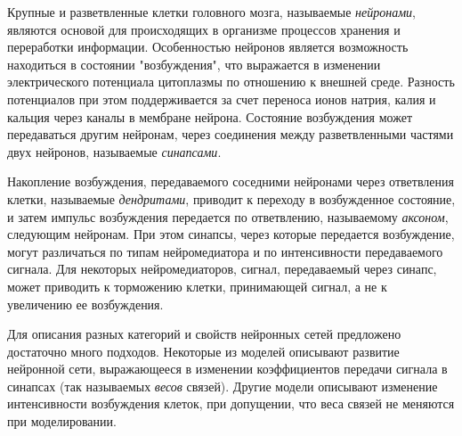 Крупные и разветвленные клетки головного мозга, называемые \textit{нейронами}, являются основой для происходящих в организме  процессов хранения и переработки информации. Особенностью нейронов является возможность находиться в состоянии "возбуждения", что выражается в изменении электрического потенциала цитоплазмы по отношению к внешней среде. Разность потенциалов при этом  поддерживается за счет переноса ионов натрия, калия и кальция через каналы в мембране нейрона. Состояние возбуждения может передаваться другим нейронам, через соединения между разветвленными частями двух нейронов, называемые \textit{синапсами}.

Накопление возбуждения, передаваемого соседними нейронами через ответвления клетки, называемые \textit{дендритами}, приводит к переходу в возбужденное состояние, и затем импульс возбуждения передается по ответвлению, называемому \textit{аксоном}, следующим нейронам. При этом синапсы, через которые передается возбуждение, могут различаться по типам нейромедиатора и по интенсивности передаваемого сигнала. Для некоторых нейромедиаторов, сигнал, передаваемый через синапс, может приводить к торможению клетки, принимающей сигнал, а не к увеличению ее возбуждения.

Для описания разных категорий и свойств нейронных сетей предложено достаточно много подходов. Некоторые из моделей описывают развитие нейронной сети, выражающееся в изменении коэффициентов передачи сигнала в синапсах (так называемых \textit{весов} связей). Другие модели описывают изменение интенсивности возбуждения клеток, при допущении, что веса связей не меняются при моделировании. 

